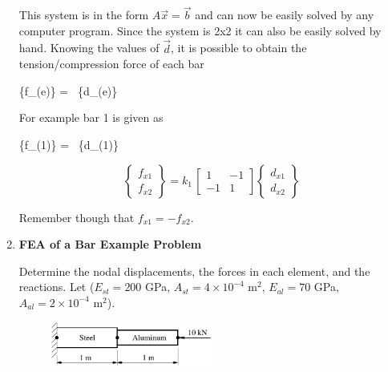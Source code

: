 \begin{enumerate}
    This system is in the form $A\vec{x} = \vec{b}$ and can now be
    easily solved by any computer program. Since the system is 2x2 it
    can also be easily solved by hand. Knowing the values of
    $\vec{d}$, it is possible to obtain the tension/compression force
    of each bar

    \beq
    \left\{f_{(e)}\right\} = \left[ K_{(e)} \right] \, \left\{d_{(e)}\right\}
    \eeq
    
    For example bar 1 is given as

    \beq
    \left\{f_{(1)}\right\} = \left[ K_{(1)} \right] \, \left\{d_{(1)}\right\}
    \eeq

    \begin{equation}
    \left\{ \begin{array}{c} f_{x1} \\ f_{x2}  \end{array} \right\}
    = k_1 \,\left[ \begin{array}{rr}
        1  &-1   \\
        -1  &1
      \end{array} \right]
    \left\{ \begin{array}{c}
      d_{x1} \\ d_{x2}
    \end{array} \right\} 
    \end{equation}

    Remember though that $f_{x1} = -f_{x2}$.

    \item {\bf FEA of a Bar Example Problem}

      Determine the nodal displacements, the forces in each
      element, and the reactions. Let ($E_{st} = 200$ GPa, $A_{st} = 4 \times
      10^{-4}$ m$^2$, $E_{al} = 70$ GPa, $A_{al} = 2 \times 10^{-4}$ m$^2$).
      
      \begin{figure}[H]
        \begin{center}
          \includegraphics[height=0.1\textwidth,width=0.5\textwidth]{Graphics/L06_F3.pdf}
        \end{center}
      \end{figure}      


\end{enumerate}

